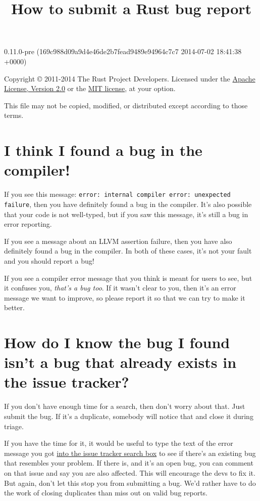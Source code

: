 \documentclass[]{article}
\title{How to submit a Rust bug report}
\begin{document}
\maketitle

0.11.0-pre (169c988d09a9d4e46de2b7fead9489e94964c7c7 2014-07-02 18:41:38 +0000)

Copyright © 2011-2014 The Rust Project Developers. Licensed under the
\href{http://www.apache.org/licenses/LICENSE-2.0}{Apache License,
Version 2.0} or the \href{http://opensource.org/licenses/MIT}{MIT
license}, at your option.

This file may not be copied, modified, or distributed except according
to those terms.

{
\hypersetup{linkcolor=black}
\setcounter{tocdepth}{3}
\tableofcontents
}
\section{I think I found a bug in the
compiler!}\label{i-think-i-found-a-bug-in-the-compiler}

If you see this message:
\texttt{error: internal compiler error: unexpected failure}, then you
have definitely found a bug in the compiler. It's also possible that
your code is not well-typed, but if you saw this message, it's still a
bug in error reporting.

If you see a message about an LLVM assertion failure, then you have also
definitely found a bug in the compiler. In both of these cases, it's not
your fault and you should report a bug!

If you see a compiler error message that you think is meant for users to
see, but it confuses you, \emph{that's a bug too}. If it wasn't clear to
you, then it's an error message we want to improve, so please report it
so that we can try to make it better.

\section{How do I know the bug I found isn't a bug that already exists
in the issue
tracker?}\label{how-do-i-know-the-bug-i-found-isnt-a-bug-that-already-exists-in-the-issue-tracker}

If you don't have enough time for a search, then don't worry about that.
Just submit the bug. If it's a duplicate, somebody will notice that and
close it during triage.

If you have the time for it, it would be useful to type the text of the
error message you got
\href{https://github.com/rust-lang/rust/issues}{into the issue tracker
search box} to see if there's an existing bug that resembles your
problem. If there is, and it's an open bug, you can comment on that
issue and say you are also affected. This will encourage the devs to fix
it. But again, don't let this stop you from submitting a bug. We'd
rather have to do the work of closing duplicates than miss out on valid
bug reports.
\end{document}
